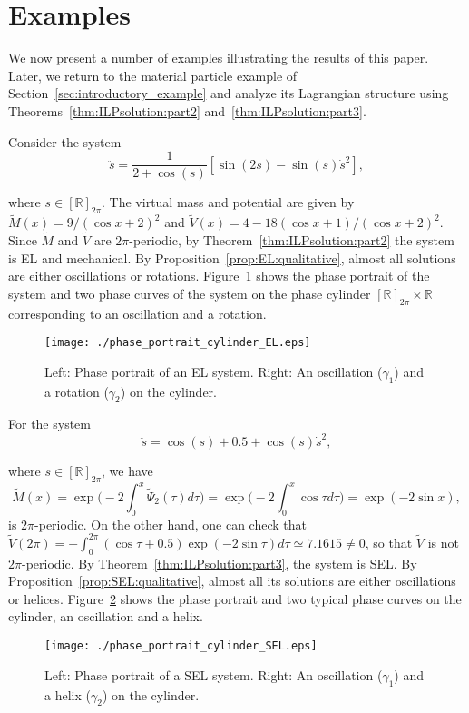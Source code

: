 \section{Examples}\label{sec:examples}

We now present a number of examples illustrating the results of this
paper. Later, we return to the material particle example of
Section~\ref{sec:introductory_example} and analyze its Lagrangian
structure using Theorems~\ref{thm:ILPsolution:part2}
and~\ref{thm:ILPsolution:part3}.
\begin{example}
	Consider the system
				\[
	\ddot{s} = \frac{1}{2+\cos(s)}[\sin(2s)-\sin(s)\dot{s}^2],
	\]
			
	where $s\in[\mathbb{R}]_{2\pi}$. The virtual mass and potential are given by
	$\tilde M(x)=9/(\cos x+2)^2$ and $\tilde V(x)=4-18(\cos x+1)/(\cos
	x+2)^2$. Since $\tilde M$ and $\tilde V$ are $2\pi$-periodic, by
	Theorem~\ref{thm:ILPsolution:part2} the system is EL and
	mechanical. By Proposition~\ref{prop:EL:qualitative}, almost all solutions
	are either oscillations or rotations. Figure~\ref{fig:EL} shows the
	phase portrait of the system and two phase curves of the system on the
	phase cylinder $[\mathbb{R}]_{2\pi}\times\mathbb{R}$ corresponding to an oscillation
	and a rotation. 
				\begin{figure}
		\label{fig:EL}
		\texttt{[image: ./phase\_portrait\_cylinder\_EL.eps]}
		\caption{Left: Phase portrait of an EL system. Right: An oscillation
			($\gamma_1$) and a rotation ($\gamma_2$) on the cylinder.}
	\end{figure}
			\end{example}

\begin{example}
	For the system
				\[
	\ddot{s} = \cos(s)+0.5+\cos(s)\dot{s}^2,
	\]
			
	where $s\in[\mathbb{R}]_{2\pi}$, we have 
				\[
	\tilde M(x) = \exp \Big(-2 \int_0^x \tilde \Psi_2(\tau) d \tau \Big) =
	\exp\big(-2 \int_0^x \cos \tau d \tau \big) = \exp ( -2 \sin x),
	\]
				is $2 \pi$-periodic. On the other hand, one can check that $\tilde V(2
	\pi) = -\int_0^{2\pi} (\cos \tau+0.5) \exp(-2 \sin \tau) d \tau \simeq
	7.1615 \neq 0$, so that $\tilde V$ is not $2 \pi$-periodic. By
	Theorem~\ref{thm:ILPsolution:part3}, the system is SEL. By
	Proposition~\ref{prop:SEL:qualitative}, almost all its solutions are
	either oscillations or helices.  Figure~\ref{fig:SEL} shows the phase
	portrait and two typical phase curves on the cylinder, an oscillation
	and a helix.
				\begin{figure}
		\label{fig:SEL}
		\texttt{[image: ./phase\_portrait\_cylinder\_SEL.eps]} 
		\caption{Left: Phase portrait of a SEL system. Right: An oscillation
			($\gamma_1$) and a helix ($\gamma_2$) on the cylinder.}
	\end{figure}
			\end{example}

